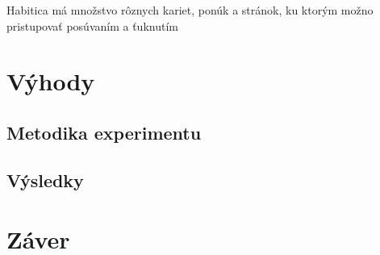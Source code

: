 \documentclass[10pt,twoside,slovak,a4paper]{article}
\begin{document}
Habitica má množstvo rôznych kariet, ponúk a stránok, ku ktorým možno pristupovať posúvaním a ťuknutím

\section{Výhody} \label{benefits}

\subsection{Metodika experimentu} \label{benefits:methodology}

\subsection{Výsledky} \label{benefits:results}

\section{Záver} \label{conclusion}


\end{document}
